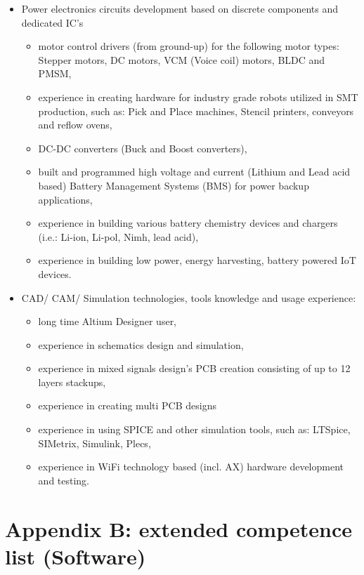 \documentclass{tccv}
\begin{document}
\begin{itemize}
	\item Power electronics circuits development based on discrete components and dedicated IC's
	\begin{itemize}
		\item motor control drivers (from ground-up) for the following motor types: Stepper motors, DC motors, VCM (Voice coil) motors, BLDC and PMSM,
		\item experience in creating hardware for industry grade robots utilized in SMT production, such as: Pick and Place machines, Stencil printers, conveyors and reflow ovens,
	\item DC-DC converters (Buck and Boost converters),
	\item built and programmed high voltage and current (Lithium and Lead acid based) Battery Management Systems (BMS) for power backup applications,
	\item experience in building various battery chemistry devices and chargers (i.e.: Li-ion, Li-pol, Nimh, lead acid), 
	\item experience in building low power, energy harvesting, battery powered IoT devices.
	\end{itemize}
\end{itemize}

\begin{itemize}
	\item CAD/ CAM/ Simulation technologies, tools knowledge and usage experience:
	\begin{itemize}
		\item long time Altium Designer user,
		\item experience in schematics design and simulation,
		\item experience in mixed signals design's PCB creation consisting of up to 12 layers stackups,
		\item experience in creating multi PCB designs
		\item experience in using SPICE and other simulation tools, such as: LTSpice, SIMetrix, Simulink, Plecs,
		\item experience in WiFi technology based (incl. AX) hardware development and testing.
		
	\end{itemize}
\end{itemize}
     
\clearpage

\section{Appendix B: extended competence list (Software)}
\end{document}
